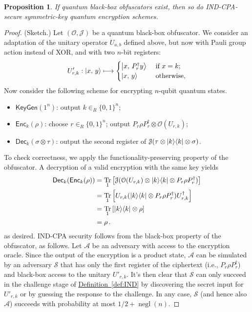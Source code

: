 \documentclass[11pt]{article}
\DeclareMathOperator{\tr}{Tr}
\numberwithin{equation}{section}
\newtheorem{prop}{Proposition}
\newcommand{\opn}{\operatorname}
\newcommand{\expref}[2]{\texorpdfstring{\hyperref[#2]{#1~\ref{#2}}}{#1~\ref{#2}}}
\newcommand{\algo}{\mathcal}
\newcommand{\negl}{\opn{negl}}
\newcommand{\KeyGen}{\ensuremath{\mathsf{KeyGen}}\xspace}
\newcommand{\Enc}{\ensuremath{\mathsf{Enc}}\xspace}
\newcommand{\Dec}{\ensuremath{\mathsf{Dec}}\xspace}
\newcommand{\inrand}{\in_R}
\begin{document}
\begin{prop}
If quantum black-box obfuscators exist, then so do IND-CPA-secure symmetric-key quantum encryption schemes.
\end{prop}
\begin{proof} (Sketch.)
Let $(\algo O, \algo J)$ be a quantum black-box obfuscator. We consider an adaptation of the unitary operator $U_{a, b}$ defined above, but now with Pauli group action instead of XOR, and with two $n$-bit registers:
$$
U'_{r, k} : {\left\vert{x,\, y}\right\rangle} \longmapsto
\begin{cases}
{\left\vert{x,\, P_r^\dagger y}\right\rangle} &\text{ if } x = k;\\
{\left\vert{x,\, y}\right\rangle} &\text{ otherwise},
\end{cases}
$$
Now consider the following scheme for encrypting $n$-qubit quantum states.
\begin{itemize}
\item $\KeyGen(1^n)$: output $k \inrand \{0, 1\}^n$;
\item $\Enc_{k}(\rho)$: choose $r \inrand \{0, 1\}^n$; output $P_r \rho P_r^\dagger \otimes \algo O(U_{r, k})$;
\item $\Dec_{k}(\sigma \otimes \tau)$: output  the second register of $\algo J(\tau \otimes \ket{k}\bra{k} \otimes \sigma)$.
\end{itemize}
To check correctness, we apply the functionality-preserving property of the obfuscator. A decryption of a valid encryption with the same key yields
\begin{align*}
\Dec_k (\Enc_k (\rho))  
&= \tr_1 \left[\algo J(\algo O(U_{r, k}) \otimes \ket{k}\bra{k} \otimes P_r \rho P_r^\dagger)\right] \\
&= \tr_1 \left[U_{r, k} (\ket{k}\bra{k} \otimes P_r \rho P_r^\dagger) U_{r, k}^\dagger\right] \\
&= \tr_1 \left[\ket{k}\bra{k} \otimes \rho \right] \\
& = \rho\,.
\end{align*}
as desired. IND-CPA security follows from the black-box property of the obfuscator, as follows. Let $\algo A$ be an adversary with access to the encryption oracle. Since the output of the encryption is a product state, $\algo A$ can be simulated by an adversary $\algo S$ that has only the first register of the ciphertext (i.e., $P_r \rho P_r^\dagger$) and black-box access to the unitary $U'_{r, k}$. It's then clear that $\algo S$ can only succeed in the challenge stage of \expref{Definition}{def:IND} by discovering the secret input for $U'_{r, k}$ or by guessing the response to the challenge. In any case, $\algo S$ (and hence also $\algo A$) succeeds with probability at most $1/2 + \negl(n)$.
\end{proof}
\end{document}

